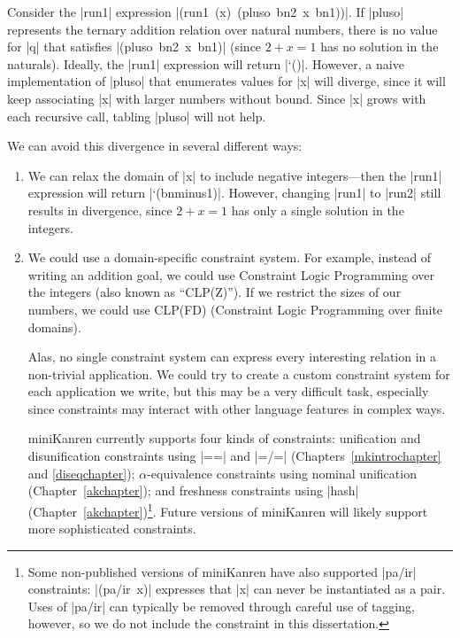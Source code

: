 Consider the \scheme|run1| expression \mbox{\scheme|(run1 (x) (pluso bn2 x bn1))|}.
If \scheme|pluso| represents the ternary addition relation
over natural numbers, there is no value for \scheme|q| that satisfies
\mbox{\scheme|(pluso bn2 x bn1)|} (since $2 + x = 1$ has no solution in
the naturals).  Ideally, the \scheme|run1| expression will return
\mbox{\schemeresult|`()|}.  However, a naive implementation of
\scheme|pluso| that enumerates values for \scheme|x| will diverge,
since it will keep associating \scheme|x| with larger numbers without
bound.  Since \scheme|x| grows with each recursive call, tabling
\scheme|pluso| will not help.

We can avoid this divergence in several different ways:

\begin{enumerate}

\item We can relax the domain of \scheme|x| to include negative
integers---then the \scheme|run1| expression will return
\mbox{\schemeresult|`(bnminus1)|}.  However, changing \scheme|run1| to
\scheme|run2| still results in divergence, since $2 + x = 1$ has only
a single solution in the integers.

\item We could use a domain-specific constraint system.  For example,
instead of writing an addition goal, we could use Constraint Logic
Programming over the integers (also known as ``CLP(Z)'').  If we restrict
the sizes of our numbers, we could use CLP(FD) (Constraint Logic
Programming over finite domains).

Alas, no single constraint system can express every interesting
relation in a non-trivial application.  We could try to create a
custom constraint system for each application we write, but this may
be a very difficult task, especially since constraints may interact
with other language features in complex ways.

miniKanren currently supports four kinds of constraints: unification
and disunification constraints using \scheme|==| and
\scheme|=/=| (Chapters~\ref{mkintrochapter} and \ref{diseqchapter});
$\alpha$-equivalence constraints using nominal
unification (Chapter~\ref{akchapter}); and freshness constraints using
\scheme|hash| (Chapter~\ref{akchapter})\footnote{Some non-published
versions of miniKanren have also supported \scheme|pa/ir| constraints:
\mbox{\scheme|(pa/ir x)|} expresses that \scheme|x| can never be
instantiated as a pair.  Uses of \scheme|pa/ir| can typically be
removed through careful use of tagging, however, so we do not include
the constraint in this dissertation.}.  Future versions of miniKanren
will likely support more sophisticated constraints.


\end{enumerate}
